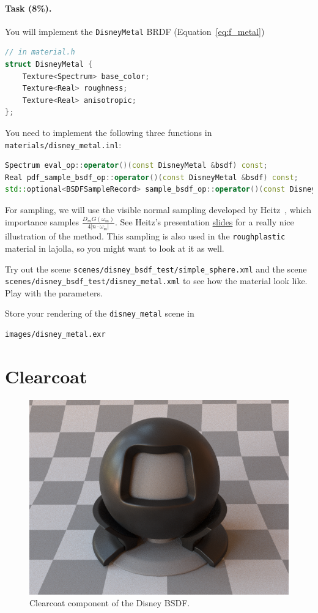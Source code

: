 \paragraph{Task (8\%).} You will implement the \lstinline{DisneyMetal} BRDF (Equation~\ref{eq:f_metal})
\begin{lstlisting}[language=c++]
// in material.h
struct DisneyMetal {
    Texture<Spectrum> base_color;
    Texture<Real> roughness;
    Texture<Real> anisotropic;
};
\end{lstlisting}

You need to implement the following three functions in \lstinline{materials/disney_metal.inl}:
\begin{lstlisting}[language=c++]
Spectrum eval_op::operator()(const DisneyMetal &bsdf) const;
Real pdf_sample_bsdf_op::operator()(const DisneyMetal &bsdf) const;
std::optional<BSDFSampleRecord> sample_bsdf_op::operator()(const DisneyMetal &bsdf) const;
\end{lstlisting}

For sampling, we will use the visible normal sampling developed by Heitz~\cite{Heitz:2018:SGD}, which importance samples $\frac{D_m G(\omega_{\text{in}})}{4 |n \cdot \omega_{\text{in}}|}$. See Heitz's presentation \href{https://jcgt.org/published/0007/04/01/slides.pdf}{slides} for a really nice illustration of the method. This sampling is also used in the \lstinline{roughplastic} material in lajolla, so you might want to look at it as well.

Try out the scene \lstinline{scenes/disney_bsdf_test/simple_sphere.xml} and the scene \\ \lstinline{scenes/disney_bsdf_test/disney_metal.xml} to see how the material look like. Play with the parameters.

Store your rendering of the \lstinline{disney_metal} scene in
\begin{lstlisting}
images/disney_metal.exr
\end{lstlisting}

\section{Clearcoat}
\begin{figure}
	\centering
	\includegraphics[width=0.5\linewidth]{imgs/disney_clearcoat.png}
	\caption{Clearcoat component of the Disney BSDF.}
\end{figure}

